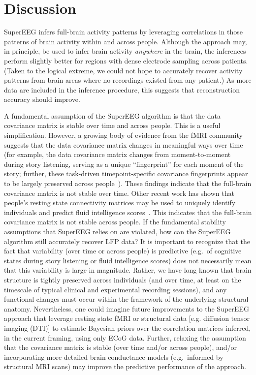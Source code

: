 \documentclass[11pt]{article}
\begin{document}
\section*{Discussion}
SuperEEG infers full-brain activity patterns by leveraging
correlations in those patterns of brain activity within and across people.  Although
the approach may, in principle, be used to infer brain activity
\textit{anywhere} in the brain, the inferences perform slightly better for
regions with dense electrode sampling across patients.  (Taken to the logical extreme, we could not hope to accurately recover activity patterns from brain areas where no recordings existed from any patient.)   As more data
are included in the inference procedure, this suggests that reconstruction accuracy should improve.

A fundamental assumption of the SuperEEG algorithm is that the data
covariance matrix is stable over time and across people.  This is a
useful simplification.  However, a growing body of evidence from the
fMRI community suggests that the data covariance matrix changes in
meaningful ways over time (for example, the data covariance matrix
changes from moment-to-moment during story listening, serving as a
unique ``fingerprint'' for each moment of the story; further, these
task-driven timepoint-specific covariance fingerprints appear to be
largely preserved across people~\cite{SimoEtal16, MannEtal17}).  These
findings indicate that the full-brain covariance matrix is not stable
over time.  Other recent work has shown that people's resting state
connectivity matrices may be used to uniquely identify individuals and
predict fluid intelligence scores~\cite{FinnEtal15}.  This indicates
that the full-brain covariance matrix is not stable across people.  If
the fundamental stability assumptions that SuperEEG relies on are
violated, how can the SuperEEG algorithm still accurately recover LFP
data?  It is important to recognize that the fact that variability
(over time or across people) is predictive (e.g.\ of cognitive states
during story listening or fluid intelligence scores) does not
necessarily mean that this variability is large in magnitude.  Rather,
we have long known that brain structure is tightly preserved across
individuals (and over time, at least on the timescale of typical
clinical and experimental recording sessions), and any functional
changes must occur within the framework of the underlying structural
anatomy.  Nevertheless, one could imagine future improvements to the
SuperEEG approach that leverage resting state fMRI or structural data
[e.g. diffusion tensor imaging (DTI)] to estimate Bayesian priors over
the correlation matrices inferred, in the current framing, using only
ECoG data.  Further, relaxing the assumption that the covariance
matrix is stable (over time and/or across people), and/or
incorporating more detailed brain conductance models (e.g.\ informed
by structural MRI scans) may improve the predictive performance of the
approach.
\end{document}
